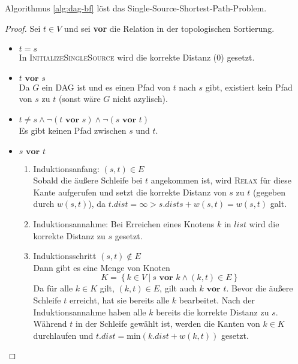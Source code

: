 \documentclass[a4paper]{scrartcl}
\begin{document}
\begin{behaupt}
    Algorithmus \ref{alg:dag-bf} löst das Single-Source-Shortest-Path-Problem.
\end{behaupt}
\begin{proof}
    Sei $t \in V$ und sei \textbf{vor} die Relation in der topologischen
    Sortierung.
    \begin{itemize}
        \item $t = s$ \\
            In \textsc{InitializeSingleSource} wird die korrekte Distanz (0) gesetzt.

        \item $t \textbf{ vor } s$ \\
            Da $G$ ein DAG ist und es einen Pfad von $t$ nach $s$ gibt,
            existiert kein Pfad von $s$ zu $t$ (sonst wäre $G$ nicht azylisch).

        \item $t \neq s \land \lnot (t \textbf{ vor } s) \land \lnot (s \textbf{ vor } t)$ \\
            Es gibt keinen Pfad zwischen $s$ und $t$.

        \item $s \textbf{ vor } t$
            \begin{enumerate}
                \item Induktionsanfang: $(s, t) \in E$ \\
                    Sobald die äußere Schleife bei $t$ angekommen ist, wird
                    \textsc{Relax} für diese Kante aufgerufen und setzt die
                    korrekte Distanz von $s$ zu $t$ (gegeben durch $w(s, t)$),
                    da $t.dist = \infty > s.dists + w(s, t) = w(s, t)$ galt.

                \item Induktionsannahme: Bei Erreichen eines Knotens $k$ in
                    $list$ wird die korrekte Distanz zu $s$ gesetzt.

                \item Induktionsschritt $(s, t) \notin E$ \\
                    Dann gibt es eine Menge von Knoten
                    \begin{equation}
                        K = \left\{ k \in V \ |\  s \textbf{ vor } k \land (k, t) \in E \right\}
                    \end{equation}
                    Da für alle $k \in K$ gilt, $(k, t) \in E$, gilt auch $k \textbf{ vor } t$.
                    Bevor die äußere Schleife $t$ erreicht, hat sie bereits alle
                    $k$ bearbeitet.
                    Nach der Induktionsannahme haben alle $k$ bereits die
                    korrekte Distanz zu $s$.
                    Während $t$ in der Schleife gewählt ist, werden die Kanten
                    von $k \in K$ durchlaufen und
                    $t.dist = \textrm{min}(k.dist + w(k, t))$ gesetzt.
                    
            \end{enumerate}

    \end{itemize}
\end{proof}
\end{document}
